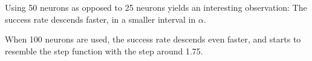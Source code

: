 Using 50 neurons as opposed to 25 neurons yields an interesting observation:
The success rate descends faster, in a smaller interval in \(\alpha\).

When 100 neurons are used, the success rate descends even faster, and starts to resemble the step function with the step around 1.75.
